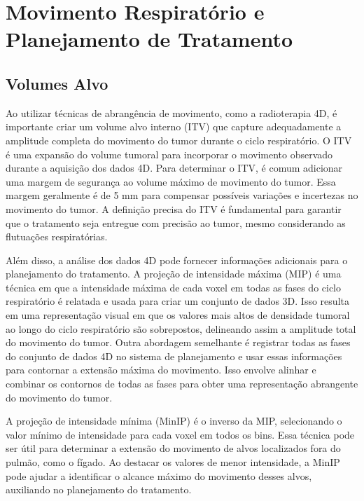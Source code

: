 \documentclass[11pt,a4paper]{article}
\begin{document}
\section{Movimento Respiratório e Planejamento de Tratamento}

\subsection*{Volumes Alvo}

	Ao utilizar técnicas de abrangência de movimento, como a radioterapia 4D, é importante criar um volume alvo interno (ITV) que capture adequadamente a amplitude completa do movimento do tumor durante o ciclo respiratório. O ITV é uma expansão do volume tumoral para incorporar o movimento observado durante a aquisição dos dados 4D. Para determinar o ITV, é comum adicionar uma margem de segurança ao volume máximo de movimento do tumor. Essa margem geralmente é de 5 mm para compensar possíveis variações e incertezas no movimento do tumor. A definição precisa do ITV é fundamental para garantir que o tratamento seja entregue com precisão ao tumor, mesmo considerando as flutuações respiratórias.

	Além disso, a análise dos dados 4D pode fornecer informações adicionais para o planejamento do tratamento. A projeção de intensidade máxima (MIP) é uma técnica em que a intensidade máxima de cada voxel em todas as fases do ciclo respiratório é relatada e usada para criar um conjunto de dados 3D. Isso resulta em uma representação visual em que os valores mais altos de densidade tumoral ao longo do ciclo respiratório são sobrepostos, delineando assim a amplitude total do movimento do tumor. Outra abordagem semelhante é registrar todas as fases do conjunto de dados 4D no sistema de planejamento e usar essas informações para contornar a extensão máxima do movimento. Isso envolve alinhar e combinar os contornos de todas as fases para obter uma representação abrangente do movimento do tumor.

	A projeção de intensidade mínima (MinIP) é o inverso da MIP, selecionando o valor mínimo de intensidade para cada voxel em todos os bins. Essa técnica pode ser útil para determinar a extensão do movimento de alvos localizados fora do pulmão, como o fígado. Ao destacar os valores de menor intensidade, a MinIP pode ajudar a identificar o alcance máximo do movimento desses alvos, auxiliando no planejamento do tratamento.
\end{document}
